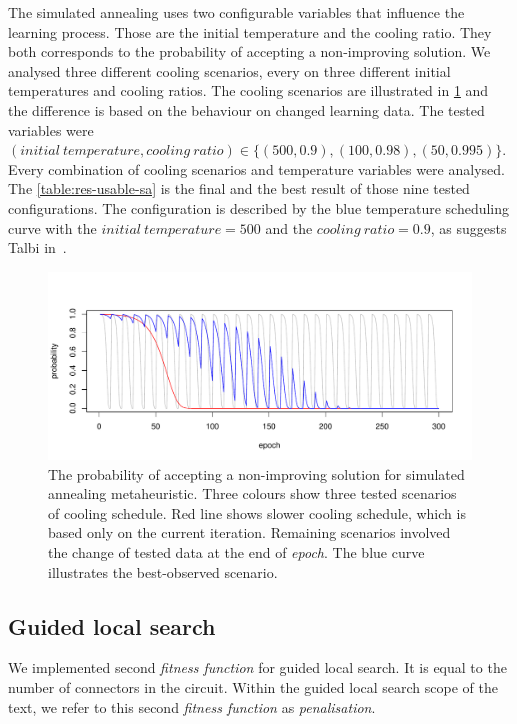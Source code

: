 \documentclass[
    digital,    %
    oneside,    %
    color,
    11pt,
    nocover,
    notable,
    nolof,
    nolot,
]{fithesis3}
\begin{document}
The simulated annealing uses two configurable variables that influence the learning process. Those are the initial temperature and the cooling ratio. They both corresponds to the probability of accepting a non-improving solution. We analysed three different cooling scenarios, every on three different initial temperatures and cooling ratios. The cooling scenarios are illustrated in \cref{fig:sa-cooling-scenarios} and the difference is based on the behaviour on changed learning data. The tested variables were $(\mathit{initial~temperature, cooling~ratio}) \in \{ (500, 0.9), (100, 0.98), (50, 0.995) \}$. Every combination of cooling scenarios and temperature variables were analysed. The \cref{table:res-usable-sa} is the final and the best result of those nine tested configurations. The configuration is described by the blue temperature scheduling curve with the $\mathit{initial~temperature} = 500$ and the $\mathit{cooling~ratio} = 0.9$, as suggests Talbi in~\cite{talbi2009metaheuristics}.

\begin{figure}
\centering
    \includegraphics[width=\textwidth]{./graphics/sa_prob}
    \caption{The probability of accepting a non-improving solution for simulated annealing metaheuristic. Three colours show three tested scenarios of cooling schedule. Red line shows slower cooling schedule, which is based only on the current iteration. Remaining scenarios involved the change of tested data at the end of \textit{epoch}. The blue curve illustrates the best-observed scenario.}
\label{fig:sa-cooling-scenarios}
\end{figure}

\subsection{Guided local search}
\label{subsec:res-ss-gls}

We implemented second \textit{fitness function} for guided local search. It is equal to the number of connectors in the circuit. Within the guided local search scope of the text, we refer to this second \textit{fitness function} as \textit{penalisation}.
\end{document}
